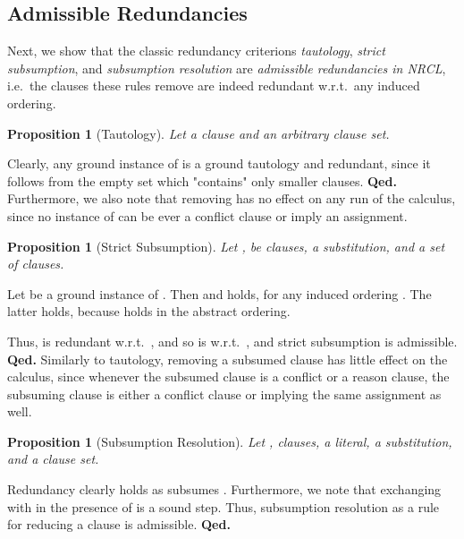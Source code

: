 \documentclass[a4paper]{article}
\newcommand{\startproof}{{\bf Proof:~}}
\newcommand{\finishproof}{{\bf Qed.}}
\newtheorem{prop}[defi]{Proposition}
\begin{document}
{\subsection{Admissible Redundancies}
Next, we show that the classic redundancy criterions \emph{tautology}, \emph{strict subsumption}, and \emph{subsumption resolution} 
are \emph{admissible redundancies in NRCL}, i.e.\ 
the clauses these rules remove are indeed redundant w.r.t.\
any induced ordering.


\begin{prop}[Tautology] Let  a clause and  an arbitrary clause set.

\end{prop}
\noindent\startproof
Clearly, any ground instance of  is a ground tautology and redundant, since it follows from the empty set which "contains" only smaller clauses.
\finishproof\leaveabit
\indent
Furthermore,  we also note that removing  has no effect on any run of the calculus, 
since no instance of  can be ever a conflict clause or imply an assignment.

\begin{prop}[Strict Subsumption]\label{propSubs}
Let ,  be clauses,  a substitution, and  a set of clauses. 

\end{prop}
\noindent\startproof
Let  be a ground instance of . Then  and  holds, for any induced ordering . 
The latter holds, because  holds in the abstract ordering.

Thus,  is redundant w.r.t.\
, and so is  w.r.t.\
, and strict subsumption is admissible.
\finishproof\leaveabit
\indent
Similarly to tautology, removing a subsumed clause has little effect on the calculus, since whenever the subsumed clause is  a conflict or a reason clause, the subsuming clause is either a
conflict clause or implying the same assignment as well.

\begin{prop}[Subsumption Resolution] 
Let ,  clauses,  a literal,  a substitution, and  a clause set.

\end{prop}
\noindent\startproof
Redundancy clearly holds as  subsumes . 
Furthermore, we note that exchanging  with  in the presence of  is a sound step.
Thus, subsumption resolution as a rule for reducing a clause is admissible.
\finishproof

}
\end{document}
